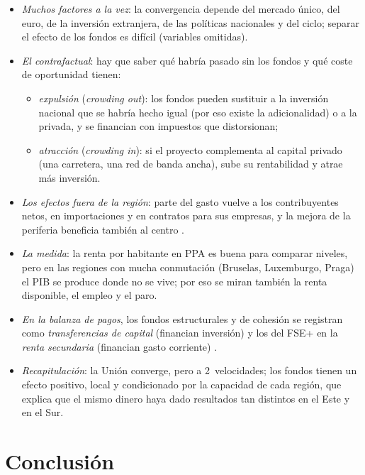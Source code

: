 \documentclass[11pt]{article}
\begin{document}
\begin{itemize}
\item \emph{Muchos factores a la vez}: la convergencia depende del mercado único, del euro, de la inversión extranjera, de las políticas nacionales y del ciclo; separar el efecto de los fondos es difícil (variables omitidas).
\item \emph{El contrafactual}: hay que saber qué habría pasado sin los fondos y qué coste de oportunidad tienen:
  \begin{itemize}
  \item \emph{expulsión} (\emph{crowding out}): los fondos pueden sustituir a la inversión nacional que se habría hecho igual (por eso existe la adicionalidad) o a la privada, y se financian con impuestos que distorsionan;
  \item \emph{atracción} (\emph{crowding in}): si el proyecto complementa al capital privado (una carretera, una red de banda ancha), sube su rentabilidad y atrae más inversión.
  \end{itemize}
\item \emph{Los efectos fuera de la región}: parte del gasto vuelve a los contribuyentes netos, en importaciones y en contratos para sus empresas, y la mejora de la periferia beneficia también al centro .
\item \emph{La medida}: la renta por habitante en PPA es buena para comparar niveles, pero en las regiones con mucha conmutación (Bruselas, Luxemburgo, Praga) el PIB se produce donde no se vive; por eso se miran también la renta disponible, el empleo y el paro.
\item \emph{En la balanza de pagos}, los fondos estructurales y de cohesión se registran como \emph{transferencias de capital} (financian inversión) y los del FSE+ en la \emph{renta secundaria} (financian gasto corriente) .
\end{itemize}

\begin{itemize}
\item \emph{Recapitulación}: la Unión converge, pero a 2~velocidades; los fondos tienen un efecto positivo, local y condicionado por la capacidad de cada región, que explica que el mismo dinero haya dado resultados tan distintos en el Este y en el Sur.
\end{itemize}

\section*{Conclusión}
\end{document}
